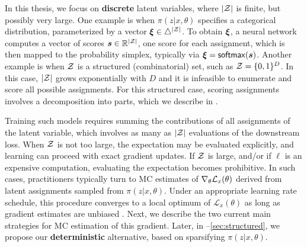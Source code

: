 \noindent In this thesis, we focus on \textbf{discrete} latent variables, where
$|\mathcal{Z}|$ is finite, but possibly very large. One example is when
$\pi(z|x,\theta)$ specifies a categorical distribution, parameterized by a
vector $\bm{\xi} \in \triangle^{|\mathcal{Z}|}$. To obtain $\bm{\xi}$, a neural network
computes a vector of scores $\bm{s} \in \mathbb{R}^{|\mathcal{Z}|}$, one score
for each assignment, which is then mapped to the probability simplex,
typically via $\bm{\xi} = \operatorname*{\mathsf{softmax}}(\bm{s})$. Another example is when $\mathcal{Z}$ is
a structured (combinatorial) set, such as $\mathcal{Z} = \{0, 1\}^D$. In this
case, $|\mathcal{Z}|$ grows exponentially with $D$ and it is infeasible to
enumerate and score all possible assignments. For this structured
case, scoring assignments involves a decomposition into parts, which
we describe in .

Training such models requires summing the contributions of all
assignments of the latent variable, which involves as many as $|\mathcal{Z}|$
evaluations of the downstream loss. When $\mathcal{Z}$ is not too large, the
expectation may be evaluated explicitly, and learning can proceed
with exact gradient updates. If $\mathcal{Z}$ is large, and/or if $\ell$ is
an expensive computation, evaluating the expectation becomes
prohibitive. In such cases, practitioners typically turn to MC
estimates of $\nabla_\theta \mathcal{L}_x(\theta)$ derived from latent
assignments sampled from $\pi(z|x,\theta)$. Under an appropriate
learning rate schedule, this procedure converges to a local optimum
of $\mathcal L_x(\theta)$ as long as gradient estimates are unbiased
\citep{robbins1951stochastic}. Next, we describe the two current main
strategies for MC estimation of this gradient. Later, in
--\ref{sec:structured}, we propose our
\textbf{deterministic} alternative, based on sparsifying $\pi(z| x,
        \theta)$.

